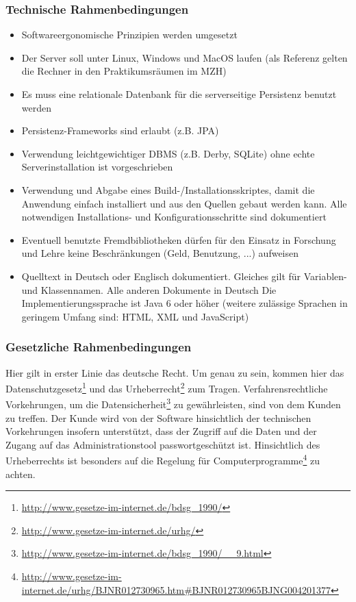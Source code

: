 \documentclass[fontsize=12pt,paper=a4,twoside]{scrartcl}
\begin{document}
\subsubsection{Technische Rahmenbedingungen} \label{subsubsec:TechRahmen} 
\begin{itemize}

\item Softwareergonomische Prinzipien werden umgesetzt
\item Der Server soll unter Linux, Windows und MacOS laufen (als Referenz gelten die Rechner in den Praktikumsräumen im MZH)
\item Es muss eine relationale Datenbank für die serverseitige Persistenz benutzt werden
\item Persistenz-Frameworks sind erlaubt (z.B. JPA)
\item Verwendung leichtgewichtiger DBMS (z.B. Derby, SQLite) ohne echte Serverinstallation ist vorgeschrieben
\item Verwendung und Abgabe eines Build-/Installationsskriptes, damit die Anwendung einfach installiert und aus den Quellen gebaut werden kann. Alle notwendigen Installations- und Konfigurationsschritte sind dokumentiert
\item Eventuell benutzte Fremdbibliotheken dürfen für den Einsatz in Forschung und Lehre keine Beschränkungen (Geld, Benutzung, ...) aufweisen
\item Quelltext in Deutsch oder Englisch dokumentiert. Gleiches gilt für Variablen- und Klassennamen. Alle anderen Dokumente in Deutsch
Die Implementierungssprache ist Java 6 oder höher (weitere zulässige Sprachen in geringem Umfang sind: HTML, XML und JavaScript)
\end{itemize}
	

\subsubsection{Gesetzliche Rahmenbedingungen} \label{subsubsec:GesetzlRahmen} Hier gilt in erster Linie das deutsche Recht. Um genau zu sein, kommen hier das Datenschutzgesetz\footnote{\url{http://www.gesetze-im-internet.de/bdsg_1990/}} und das Urheberrecht\footnote{\url{http://www.gesetze-im-internet.de/urhg/}} zum Tragen. Verfahrensrechtliche Vorkehrungen, um die Datensicherheit\footnote{\url{http://www.gesetze-im-internet.de/bdsg_1990/__9.html}} zu gewährleisten, sind von dem Kunden zu treffen. Der Kunde wird von der Software hinsichtlich der technischen Vorkehrungen insofern unterstützt, dass der Zugriff auf die Daten und der Zugang auf das Administrationstool passwortgeschützt ist. Hinsichtlich des Urheberrechts ist besonders auf die Regelung für Computerprogramme\footnote{\url{http://www.gesetze-im-internet.de/urhg/BJNR012730965.htm\#BJNR012730965BJNG004201377}} zu achten.
\end{document}
